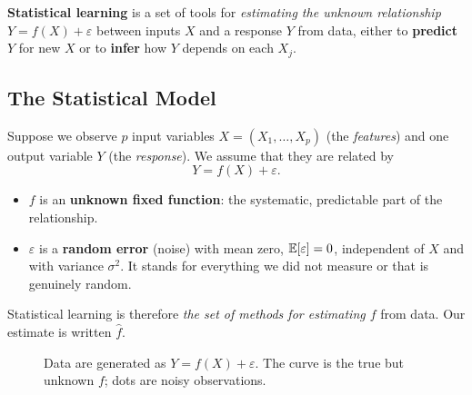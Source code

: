 \begin{definition}
\textbf{Statistical learning} is a set of tools for \emph{estimating the unknown relationship} $Y=f(X)+\varepsilon$ between inputs $X$ and a response $Y$ from data, either to \textbf{predict} $Y$ for new $X$ or to \textbf{infer} how $Y$ depends on each $X_j$.
\end{definition}

\subsection{The Statistical Model}

Suppose we observe $p$ input variables $X=(X_1,\dots,X_p)$ (the \emph{features}) and one output variable $Y$ (the \emph{response}). We assume that they are related by
\begin{equation}\label{eq:model}
  Y = f(X) + \varepsilon .
\end{equation}
\begin{itemize}
  \item $f$ is an \textbf{unknown fixed function}: the systematic, predictable part of the relationship.
  \item $\varepsilon$ is a \textbf{random error} (noise) with mean zero, $\mathbb{E}[\varepsilon]=0$, independent of $X$ and with variance $\sigma^2$. It stands for everything we did not measure or that is genuinely random.
\end{itemize}
Statistical learning is therefore \emph{the set of methods for estimating $f$} from data. Our estimate is written $\hat f$.

\begin{figure}[!htbp]
\centering
{}
\caption{Data are generated as $Y=f(X)+\varepsilon$. The curve is the true but unknown $f$; dots are noisy observations.}\label{fig:model}
\end{figure}

